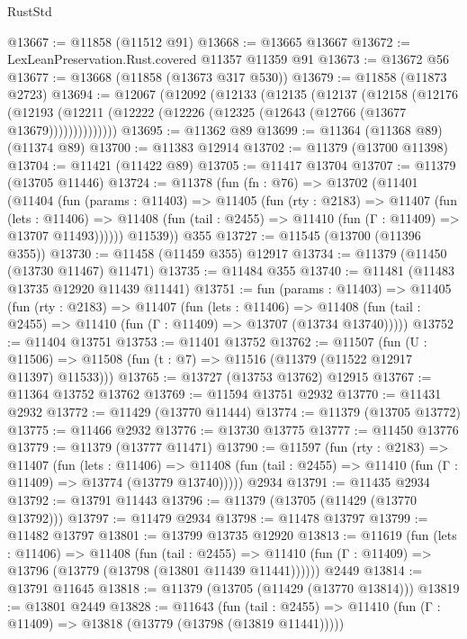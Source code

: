 \begin{lexlean}{RustStd}
\begin{coremodule}
@13667 := @11858 (@11512 @91)
@13668 := @13665 @13667
@13672 := LexLeanPreservation.Rust.covered @11357 @11359 @91
@13673 := @13672 @56
@13677 := @13668 (@11858 (@13673 @317 @530))
@13679 := @11858 (@11873 @2723)
@13694 := @12067
    (@12092
      (@12133
        (@12135
          (@12137
            (@12158
              (@12176
                (@12193 (@12211 (@12222 (@12226 (@12325 (@12643 (@12766 (@13677 @13679))))))))))))))
@13695 := @11362 @89
@13699 := @11364 (@11368 @89) (@11374 @89)
@13700 := @11383 @12914
@13702 := @11379 (@13700 @11398)
@13704 := @11421 (@11422 @89)
@13705 := @11417 @13704
@13707 := @11379 (@13705 @11446)
@13724 := @11378
    (fun (fn : @76) =>
    @13702
      (@11401
        (@11404
          (fun (params : @11403) =>
          @11405
            (fun (rty : @2183) =>
            @11407
              (fun (lets : @11406) =>
              @11408 (fun (tail : @2455) => @11410 (fun (Γ : @11409) => @13707 @11493))))))
        @11539))
    @355
@13727 := @11545 (@13700 (@11396 @355))
@13730 := @11458 (@11459 @355) @12917
@13734 := @11379 (@11450 (@13730 @11467) @11471)
@13735 := @11484 @355
@13740 := @11481 (@11483 @13735 @12920 @11439 @11441)
@13751 := fun (params : @11403) =>
  @11405
    (fun (rty : @2183) =>
    @11407
      (fun (lets : @11406) =>
      @11408 (fun (tail : @2455) => @11410 (fun (Γ : @11409) => @13707 (@13734 @13740)))))
@13752 := @11404 @13751
@13753 := @11401 @13752
@13762 := @11507
    (fun (U : @11506) => @11508 (fun (t : @7) => @11516 (@11379 (@11522 @12917 @11397) @11533)))
@13765 := @13727 (@13753 @13762) @12915
@13767 := @11364 @13752 @13762
@13769 := @11594 @13751 @2932
@13770 := @11431 @2932
@13772 := @11429 (@13770 @11444)
@13774 := @11379 (@13705 @13772)
@13775 := @11466 @2932
@13776 := @13730 @13775
@13777 := @11450 @13776
@13779 := @11379 (@13777 @11471)
@13790 := @11597
    (fun (rty : @2183) =>
    @11407
      (fun (lets : @11406) =>
      @11408 (fun (tail : @2455) => @11410 (fun (Γ : @11409) => @13774 (@13779 @13740)))))
    @2934
@13791 := @11435 @2934
@13792 := @13791 @11443
@13796 := @11379 (@13705 (@11429 (@13770 @13792)))
@13797 := @11479 @2934
@13798 := @11478 @13797
@13799 := @11482 @13797
@13801 := @13799 @13735 @12920
@13813 := @11619
    (fun (lets : @11406) =>
    @11408
      (fun (tail : @2455) =>
      @11410 (fun (Γ : @11409) => @13796 (@13779 (@13798 (@13801 @11439 @11441))))))
    @2449
@13814 := @13791 @11645
@13818 := @11379 (@13705 (@11429 (@13770 @13814)))
@13819 := @13801 @2449
@13828 := @11643
    (fun (tail : @2455) => @11410 (fun (Γ : @11409) => @13818 (@13779 (@13798 (@13819 @11441)))))

\end{coremodule}
\end{lexlean}
